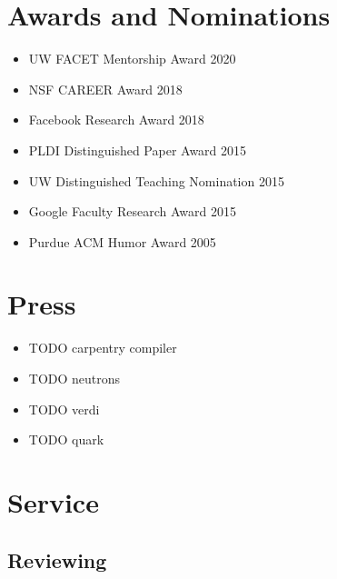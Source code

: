 \documentclass[10pt]{article}
\begin{document}
\section*{Awards and Nominations}

\begin{itemize}
  \item UW FACET Mentorship Award 2020
  \item NSF CAREER Award 2018
  \item Facebook Research Award 2018
  \item PLDI Distinguished Paper Award 2015
  \item UW Distinguished Teaching Nomination 2015
  \item Google Faculty Research Award 2015
  \item Purdue ACM Humor Award 2005
\end{itemize}

\section*{Press}

\begin{itemize}
  \item TODO carpentry compiler
  \item TODO neutrons
  \item TODO verdi
  \item TODO quark
\end{itemize}


\section*{Service}

\subsection*{Reviewing}
\end{document}
